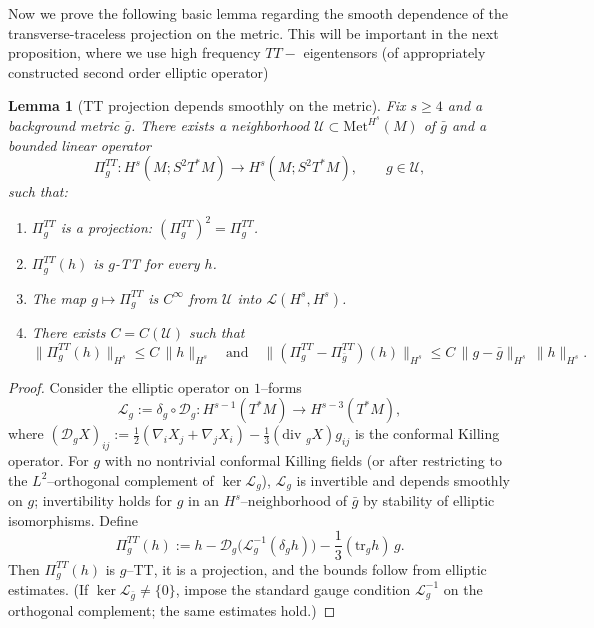 \documentclass{amsart}
\newtheorem{lemma}{Lemma}[section]
\renewcommand{\div}{\mbox{div }}
\newcommand{\tr}{\mbox{tr}}
\begin{document}
\noindent Now we prove the following basic lemma regarding the smooth dependence of the transverse-traceless projection on the metric. This will be important in the next proposition, where we use high frequency $TT-$ eigentensors (of appropriately constructed second order elliptic operator)
\begin{lemma}[TT projection depends smoothly on the metric]
\label{lem:TT-projection}
Fix $s\ge4$ and a background metric $\bar g$. There exists a neighborhood
$\mathcal U\subset \text{Met}^{H^{s}}(M)$ of $\bar g$ and a bounded linear operator
\[
\Pi^{TT}_g: H^{s}(M;S^{2}T^{*}M)\to H^{s}(M;S^{2}T^{*}M),
\qquad g\in\mathcal U,
\]
such that:
\begin{enumerate}
\item $\Pi^{TT}_g$ is a projection: $(\Pi^{TT}_g)^2=\Pi^{TT}_g$.
\item $\Pi^{TT}_g(h)$ is $g$-TT for every $h$.
\item The map $g\mapsto \Pi^{TT}_g$ is $C^\infty$ from $\mathcal U$ into
$\mathcal L(H^{s},H^{s})$.
\item There exists $C=C(\mathcal U)$ such that
\begin{equation}
\label{eq:TTproj-bound}
\|\Pi^{TT}_g(h)\|_{H^{s}} \le C\,\|h\|_{H^{s}}
\quad\text{and}\quad
\|(\Pi^{TT}_g-\Pi^{TT}_{\bar g})(h)\|_{H^{s}} \le C\,\|g-\bar g\|_{H^{s}}\,\|h\|_{H^{s}}.
\end{equation}
\end{enumerate}
\end{lemma}

\begin{proof}
Consider the elliptic operator on $1$--forms
\[
\mathcal L_g := \delta_g\circ \mathcal D_g : H^{s-1}(T^*M)\to H^{s-3}(T^*M),
\]
where $(\mathcal D_g X)_{ij}:=\frac12(\nabla_i X_j+\nabla_j X_i)-\frac13(\div_g X)g_{ij}$
is the conformal Killing operator. For $g$ with no nontrivial conformal Killing fields
(or after restricting to the $L^2$--orthogonal complement of $\ker \mathcal L_g$),
$\mathcal L_g$ is invertible and depends smoothly on $g$; invertibility holds for $g$
in an $H^{s}$--neighborhood of $\bar g$ by stability of elliptic isomorphisms.
Define
\[
\Pi^{TT}_g(h) := h - \mathcal D_g\big(\mathcal L_g^{-1}(\delta_g h)\big)
- \frac13(\tr_g h)\,g.
\]
Then $\Pi^{TT}_g(h)$ is $g$--TT, it is a projection, and the bounds follow from elliptic estimates.
(If $\ker\mathcal L_{\bar g}\neq\{0\}$, impose the standard gauge condition
$\mathcal L_g^{-1}$ on the orthogonal complement; the same estimates hold.)
\end{proof}
\end{document}
